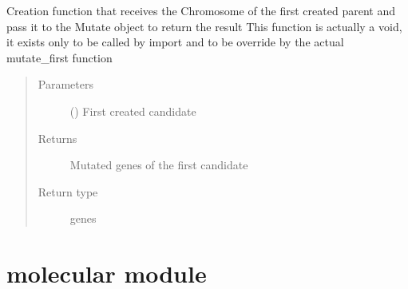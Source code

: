 \documentclass[letterpaper,10pt,english]{sphinxmanual}
\begin{document}

\begin{fulllineitems}
\label{\detokenize{genetic:genetic.mutate_first}}
\sphinxAtStartPar
Creation function that receives the Chromosome of the first created parent and pass it to the Mutate object to
return the result
This function is actually a void, it exists only to be called by import and to be override by the actual
mutate\_first function
\begin{quote}\begin{description}
\item[{Parameters}] \leavevmode
\sphinxAtStartPar
{} ({\hyperref[\detokenize{genetic:genetic.Chromosome}]{}}) \textendash{} First created candidate

\item[{Returns}] \leavevmode
\sphinxAtStartPar
Mutated genes of the first candidate

\item[{Return type}] \leavevmode
\sphinxAtStartPar
genes

\end{description}\end{quote}

\end{fulllineitems}



\section{molecular module}
\label{\detokenize{molecular:module-molecular}}\label{\detokenize{molecular:molecular-module}}\label{\detokenize{molecular::doc}}
\end{document}
